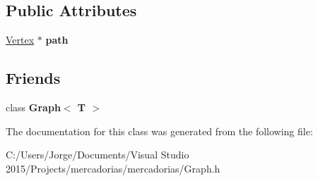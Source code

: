 \subsection*{Public Attributes}
\begin{DoxyCompactItemize}
\item 
\hyperlink{class_vertex}{Vertex} $\ast$ {\bfseries path}\hypertarget{class_vertex_abd40febd917aa25add6bd42237c8463a}{}\label{class_vertex_abd40febd917aa25add6bd42237c8463a}

\end{DoxyCompactItemize}
\subsection*{Friends}
\begin{DoxyCompactItemize}
\item 
class {\bfseries Graph$<$ T $>$}\hypertarget{class_vertex_aefa9b76cd57411c5354e5620dc2d84dd}{}\label{class_vertex_aefa9b76cd57411c5354e5620dc2d84dd}

\end{DoxyCompactItemize}


The documentation for this class was generated from the following file\+:\begin{DoxyCompactItemize}
\item 
C\+:/\+Users/\+Jorge/\+Documents/\+Visual Studio 2015/\+Projects/mercadorias/mercadorias/Graph.\+h\end{DoxyCompactItemize}
